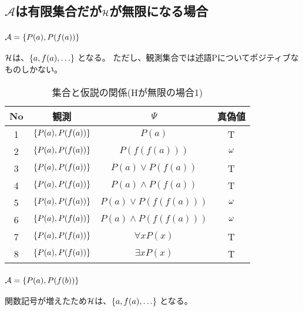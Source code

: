\documentclass[10pt, oneside]{jarticle}   	%
\begin{document}
\subsection{$\mathcal{A}$は有限集合だが$\mathcal{H}$が無限になる場合}
\subsubsection{$\mathcal{A}=\{{P(a), P(f(a))}\}$}
$\mathcal{H}$は、$\{{a, f(a), \dots}\}$ となる。
ただし、観測集合では述語Pについてポジティブなものしかない。

\begin{table}[htbp]
 \centering
 \begin{tabular}{|c|c|c|c|}\hline
   No & 観測 & $\Psi$ & 真偽値 \\ \hline
   1 & $\{{P(a), P(f(a))}\}$ & $P(a)$ & T \\ \hline
   2 & $\{{P(a), P(f(a))}\}$ & $P(f(f(a)))$ & $\omega $\\ \hline
   3 & $\{{P(a), P(f(a))}\}$ & $P(a) \lor P(f(a))$ & T \\ \hline
   4 & $\{{P(a), P(f(a))}\}$ & $P(a) \land P(f(a))$ & T\\ \hline
   
   5 & $\{{P(a), P(f(a))}\}$ & $P(a) \lor P(f(f(a)))$ & $\omega$ \\ \hline
   6 & $\{{P(a), P(f(a))}\}$ & $P(a) \land P(f(f(a)))$ & $\omega$ \\ \hline

   7 & $\{{P(a), P(f(a))}\}$ & $\forall x P(x)$ & T \\ \hline
   8 & $\{{P(a), P(f(a))}\}$ & $\exists x P(x)$ & T \\ \hline
 \end{tabular}
 \caption{集合と仮説の関係(Hが無限の場合1)}
 \label{tab:ex0201}
\end{table}

\subsubsection{$\mathcal{A}=\{{P(a), P(f(b))}\}$}
関数記号が増えたため$\mathcal{H}$は、$\{{a, f(a), \dots}\}$ となる。
\end{document}

